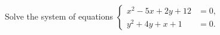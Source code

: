 Solve the system of equations $\left\{\begin{aligned} x^{2}-5x+2y+12 &=0, \\ y^{2}+4y+x+1 &=0. \end{aligned}\right.$
